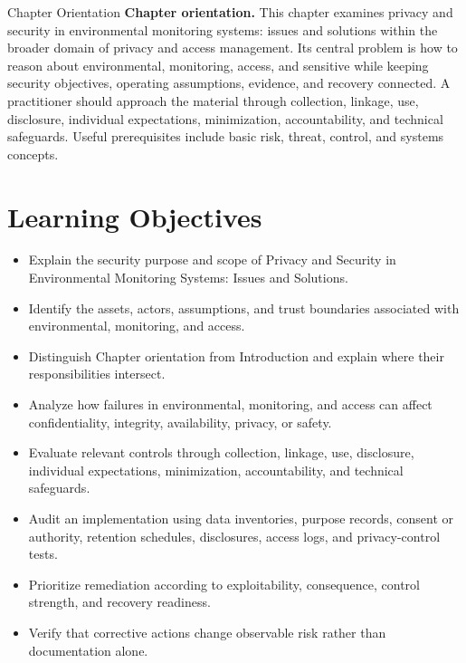 \documentclass[11pt,letterpaper]{article}
\title{\CornellDocumentTitle}
\author{}
\date{}
\begin{document}
\maketitle
\begin{CornellOverviewBox}{Chapter Orientation}
\textbf{Chapter orientation.} This chapter examines privacy and security in environmental monitoring systems: issues and solutions within the broader domain of privacy and access management. Its central problem is how to reason about environmental, monitoring, access, and sensitive while keeping security objectives, operating assumptions, evidence, and recovery connected. A practitioner should approach the material through collection, linkage, use, disclosure, individual expectations, minimization, accountability, and technical safeguards. Useful prerequisites include basic risk, threat, control, and systems concepts.
\end{CornellOverviewBox}
\section*{Learning Objectives}
\begin{itemize}
\item Explain the security purpose and scope of Privacy and Security in Environmental Monitoring Systems: Issues and Solutions.
\item Identify the assets, actors, assumptions, and trust boundaries associated with environmental, monitoring, and access.
\item Distinguish Chapter orientation from Introduction and explain where their responsibilities intersect.
\item Analyze how failures in environmental, monitoring, and access can affect confidentiality, integrity, availability, privacy, or safety.
\item Evaluate relevant controls through collection, linkage, use, disclosure, individual expectations, minimization, accountability, and technical safeguards.
\item Audit an implementation using data inventories, purpose records, consent or authority, retention schedules, disclosures, access logs, and privacy-control tests.
\item Prioritize remediation according to exploitability, consequence, control strength, and recovery readiness.
\item Verify that corrective actions change observable risk rather than documentation alone.
\end{itemize}
\end{document}
